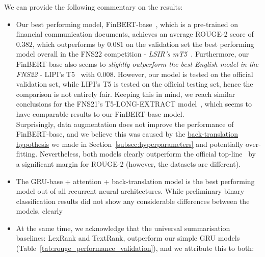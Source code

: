 We can provide the following commentary on the results:
\begin{itemize}
    \item Our best performing model, FinBERT-base~\cite{yang2020finbert}, which is a pre-trained on financial communication documents,
        achieves an average ROUGE-2 score of $0.382$, which outperforms by $0.081$ on the validation set the best performing
        model overall in the FNS22 competition - \emph{LSIR's mT5}~\cite{foroutan-etal-2022-multilingual}.
        Furthermore, our FinBERT-base also seems to \emph{slightly outperform the best English model in the FNS22} - LIPI's T5~\cite{el-haj-etal-2022-financial} with $0.008$.
        However, our model is tested on the official validation set, while LIPI's T5 is tested on the official testing set, hence the comparison is not entirely fair.
        Keeping this in mind, we reach similar conclusions for the FNS21's T5-LONG-EXTRACT model~\cite{orzhenovskii-2021-t5}, which seems to have comparable results to our FinBERT-base model. \\
        Surprisingly, data augmentation does not improve the performance of FinBERT-base, and we believe this was caused by
        the \hyperlink{data_augment_hypothesis}{back-translation hypothesis} we made in Section~\ref{subsec:hyperparameters} and potentially over-fitting.
        Nevertheless, both models clearly outperform the official top-line~\cite{litvak-last-2013-multilingual} by a significant margin for ROUGE-2 (however, the datasets are different).
    \item The GRU-base + attention + back-translation model is the best performing model out of all recurrent neural architectures.
    While preliminary binary classification results did not show any considerable differences between the models, clearly
    \item At the same time, we acknowledge that the universal summarisation baselines: LexRank and TextRank, outperform
        our simple GRU models (Table~\ref{tab:rouge_performance_validation}), and we attribute this to both:

\end{itemize}
